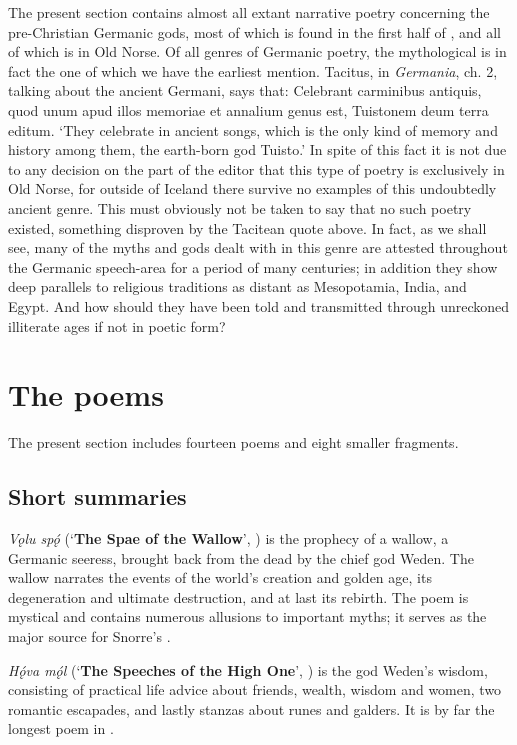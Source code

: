 
The present section contains almost all extant narrative poetry concerning the pre-Christian Germanic gods, most of which is found in the first half of \Regius, and all of which is in Old Norse.
Of all genres of Germanic poetry, the mythological is in fact the one of which we have the earliest mention.  Tacitus, in \emph{Germania}, ch. 2, talking about the ancient Germani, says that: \textlatin{Celebrant carminibus antiquis, quod unum apud illos memoriae et annalium genus est, Tuistonem deum terra editum.} ‘They celebrate in ancient songs, which is the only kind of memory and history among them, the earth-born god Tuisto.’
In spite of this fact it is not due to any decision on the part of the editor that this type of poetry is exclusively in Old Norse, for outside of Iceland there survive no examples of this undoubtedly ancient genre.
This must obviously not be taken to say that no such poetry existed, something disproven by the Tacitean quote above.  In fact, as we shall see, many of the myths and gods dealt with in this genre are attested throughout the Germanic speech-area for a period of many centuries; in addition they show deep parallels to religious traditions as distant as Mesopotamia, India, and Egypt.  And how should they have been told and transmitted through unreckoned illiterate ages if not in poetic form?

\section{The poems}

The present section includes fourteen poems and eight smaller fragments.

\subsection{Short summaries}

\emph{Vǫlu spǫ́} (‘\textbf{The Spae of the Wallow}’, ) is the prophecy of a wallow, a Germanic seeress, brought back from the dead by the chief god Weden.  The wallow narrates the events of the world’s creation and golden age, its degeneration and ultimate destruction, and at last its rebirth.  The poem is mystical and contains numerous allusions to important myths; it serves as the major source for Snorre’s \Gylfaginning.

\emph{Hǫ́va mǫ́l} (‘\textbf{The Speeches of the High One}’, ) is the god Weden’s wisdom, consisting of practical life advice about friends, wealth, wisdom and women, two romantic escapades, and lastly stanzas about runes and galders.  It is by far the longest poem in \Regius.

